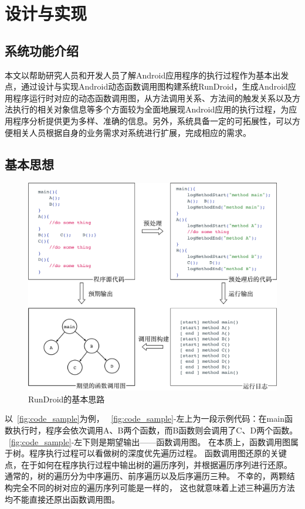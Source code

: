 \chapter{设计与实现 }
\label{ch3}

\section{系统功能介绍}
本文以帮助研究人员和开发人员了解Android应用程序的执行过程作为基本出发点，通过设计与实现Android动态函数调用图构建系统RunDroid，生成Android应用程序运行时对应的动态函数调用图，从方法调用关系、方法间的触发关系以及方法执行的相关对象信息等多个方面较为全面地展现Android应用的执行过程，为应用程序分析提供更为多样、准确的信息。另外，系统具备一定的可拓展性，可以方便相关人员根据自身的业务需求对系统进行扩展，完成相应的需求。

\section{基本思想}



\begin{figure}[h]
	\centering
	\includegraphics[width=\textwidth]{./Figures/code-sample.png}
	\caption{RunDroid的基本思路}
	\label{fig:code_sample}
\end{figure}


以~\autoref{fig:code_sample}为例，%
~\autoref{fig:code_sample}-左上为一段示例代码：在main函数执行时，程序会依次调用A、B两个函数，而B函数则会调用了C、D两个函数。
~\autoref{fig:code_sample}-左下则是期望输出——函数调用图。
在本质上，函数调用图属于树。程序执行过程可以看做树的深度优先遍历过程。
函数调用图还原的关键点，在于如何在程序执行过程中输出树的遍历序列，并根据遍历序列进行还原。
通常的，树的遍历分为中序遍历、前序遍历以及后序遍历三种。
不幸的，两颗结构完全不同的树对应的遍历序列可能是一样的，
这也就意味着上述三种遍历方法均不能直接还原出函数调用图。

